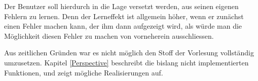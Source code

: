 Der Benutzer soll hierdurch in die Lage versetzt werden, aus seinen eigenen
Fehlern zu lernen. Denn der Lerneffekt ist allgemein höher, wenn er zunächst
einen Fehler machen kann, der ihm dann aufgezeigt wird, als würde man die
Möglichkeit diesen Fehler zu machen von vorneherein ausschliessen.\vspace{10pt}

Aus zeitlichen Gründen war es nicht möglich den Stoff der Vorlesung
voll\-ständig umzusetzen. Kapitel \ref{Perspective} beschreibt die bislang nicht
implementierten Funktionen, und zeigt mögliche Realisierungen auf.


